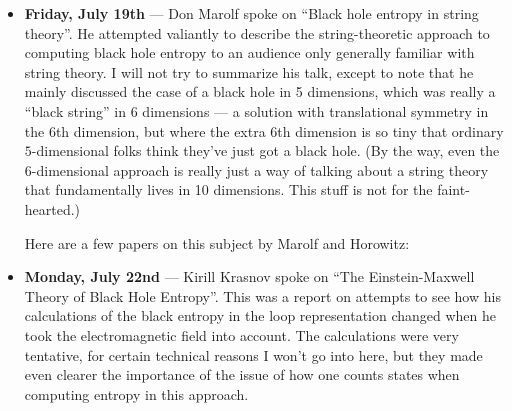 \documentclass{article}
\renewcommand{\texttt}[1]{%
  \begingroup
  \ttfamily
  \begingroup\lccode`~=`/\lowercase{\endgroup\def~}{/\discretionary{}{}{}}%
  \begingroup\lccode`~=`[\lowercase{\endgroup\def~}{[\discretionary{}{}{}}%
  \begingroup\lccode`~=`.\lowercase{\endgroup\def~}{.\discretionary{}{}{}}%
  \catcode`/=\active\catcode`[=\active\catcode`.=\active
  \scantokens{#1\noexpand}%
  \endgroup
}
\begin{document}
\begin{itemize}
\item
  \textbf{Friday, July 19th} --- Don Marolf spoke on ``Black hole
  entropy in string theory''. He attempted valiantly to describe the
  string-theoretic approach to computing black hole entropy to an
  audience only generally familiar with string theory. I will not try to
  summarize his talk, except to note that he mainly discussed the case
  of a black hole in 5 dimensions, which was really a ``black string''
  in 6 dimensions --- a solution with translational symmetry in the 6th
  dimension, but where the extra 6th dimension is so tiny that ordinary
  \(5\)-dimensional folks think they've just got a black hole. (By the
  way, even the \(6\)-dimensional approach is really just a way of
  talking about a string theory that fundamentally lives in 10
  dimensions. This stuff is not for the faint-hearted.)

  Here are a few papers on this subject by Marolf and Horowitz:

\item
  \textbf{Monday, July 22nd} --- Kirill Krasnov spoke on ``The
  Einstein-Maxwell Theory of Black Hole Entropy''. This was a report on
  attempts to see how his calculations of the black entropy in the loop
  representation changed when he took the electromagnetic field into
  account. The calculations were very tentative, for certain technical
  reasons I won't go into here, but they made even clearer the
  importance of the issue of how one counts states when computing
  entropy in this approach.


\end{itemize}
\end{document}
